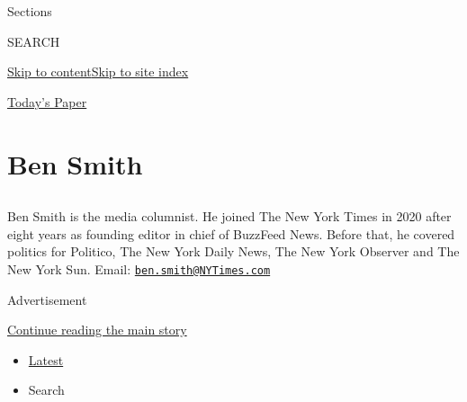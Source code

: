 Sections

SEARCH

\protect\hyperlink{site-content}{Skip to
content}\protect\hyperlink{site-index}{Skip to site index}

\href{https://myaccount.nytimes3xbfgragh.onion/auth/login?response_type=cookie\&client_id=vi}{}

\href{https://www.nytimes3xbfgragh.onion/section/todayspaper}{Today's
Paper}

\hypertarget{ben-smith}{%
\section{Ben Smith}\label{ben-smith}}

\subsection{}

Ben Smith is the media columnist. He joined The New York Times in 2020
after eight years as founding editor in chief of BuzzFeed News. Before
that, he covered politics for Politico, The New York Daily News, The New
York Observer and The New York Sun. Email:
\href{mailto:ben.smith@NYTimes.com}{\nolinkurl{ben.smith@NYTimes.com}}

Advertisement

\protect\hyperlink{after-mid1}{Continue reading the main story}

\begin{itemize}
\tightlist
\item
  \protect\hyperlink{stream-panel}{Latest}
\item
  Search
\end{itemize}

